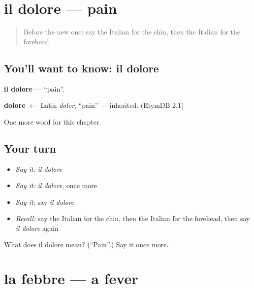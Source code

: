 \section[il dolore]{il dolore — pain}

\label{lesson:IT-C40-dolore}



\begin{quote}
Before the new one: say the Italian for the chin, then the Italian for the forehead.
\end{quote}

\subsection*{You'll want to know: il dolore}
\textbf{il dolore} — \textquotedblleft{}pain\textquotedblright{}.

\begin{cousinweb}
\textbf{dolore} $\leftarrow$ Latin \emph{dolor}, \textquotedblleft{}pain\textquotedblright{} — inherited. (EtymDB 2.1)
\end{cousinweb}

\begin{grammarlens}[title={What you've built}]
One more word for this chapter.
\end{grammarlens}

\subsection*{Your turn}
\begin{itemize}
\raggedright
  \item \emph{Say it:} \emph{il dolore}
  \item \emph{Say it:} \emph{il dolore}, once more
  \item \emph{Say it:} say \emph{il dolore}
  \item \emph{Recall:} say the Italian for the chin, then the Italian for the forehead, then say \emph{il dolore} again
\end{itemize}

\begin{tcolorbox}[breakable,colback=teal!4,colframe=teal!35!black,title={Before you move on}]
What does il dolore mean? (\textquotedblleft{}Pain\textquotedblright{}.) Say it once more.
\end{tcolorbox}
\section[la febbre]{la febbre — a fever}

